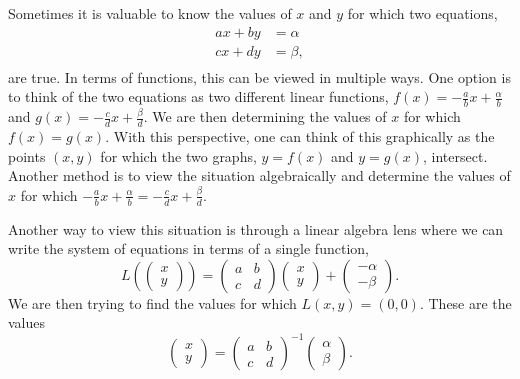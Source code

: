 \documentclass[
]{book}
\theoremstyle{definition}
\theoremstyle{definition}
\theoremstyle{definition}
\theoremstyle{definition}
\theoremstyle{remark}
\begin{document}
Sometimes it is valuable to know the values of \(x\) and \(y\) for which two equations,
\begin{align*}
    ax+by &= \alpha \\
    c x + d y &= \beta, \\
\end{align*}
are true. In terms of functions, this can be viewed in multiple ways. One option is to think of the two equations as two different linear functions, \(f(x)=-\frac{a}{b} x + \frac{\alpha}{b}\) and \(g(x) = -\frac{c}{d} x + \frac{\beta}{d}\). We are then determining the values of \(x\) for which \(f(x)=g(x)\). With this perspective, one can think of this graphically as the points \((x,y)\) for which the two graphs, \(y=f(x)\) and \(y=g(x)\), intersect. Another method is to view the situation algebraically and determine the values of \(x\) for which \(-\frac{a}{b} x + \frac{\alpha}{b}=-\frac{c}{d} x + \frac{\beta}{d}\).

Another way to view this situation is through a linear algebra lens where we can write the system of equations in terms of a single function,
\[L\left( \begin{pmatrix} x \\ y \end{pmatrix} \right) = \begin{pmatrix} a & b \\ c & d \end{pmatrix} \begin{pmatrix} x \\ y \end{pmatrix} + \begin{pmatrix} -\alpha \\ - \beta \end{pmatrix}.\] We are then trying to find the values for which \(L(x,y) = (0,0)\). These are the values
\[\begin{pmatrix} x \\ y \end{pmatrix}= \begin{pmatrix} a & b \\ c & d \end{pmatrix}^{-1} \begin{pmatrix} \alpha \\ \beta \end{pmatrix}.\]
\end{document}
